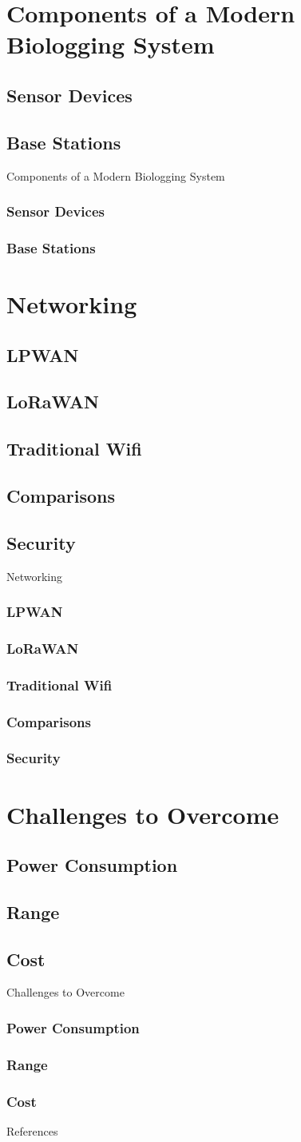 \documentclass{beamer}
\begin{document}
\section{Components of a Modern Biologging System}
\subsection{Sensor Devices}
\subsection{Base Stations}

\begin{frame}{Components of a Modern Biologging System}
  \frametitle{Sensor Devices}
  \frametitle{Base Stations}
\end{frame}


\section{Networking}
\subsection{LPWAN}
\subsection{LoRaWAN}
\subsection{Traditional Wifi}
\subsection{Comparisons}
\subsection{Security}

\begin{frame}{Networking}
  \frametitle{LPWAN}
  \frametitle{LoRaWAN}
  \frametitle{Traditional Wifi}
  \frametitle{Comparisons}
  \frametitle{Security}
\end{frame}

\section{Challenges to Overcome}
\subsection{Power Consumption}
\subsection{Range}
\subsection{Cost}

\begin{frame}{Challenges to Overcome}
  \frametitle{Power Consumption}
  \frametitle{Range}
  \frametitle{Cost}
\end{frame}

\begin{frame}{References}
  \printbibliography
\end{frame}
\end{document}
